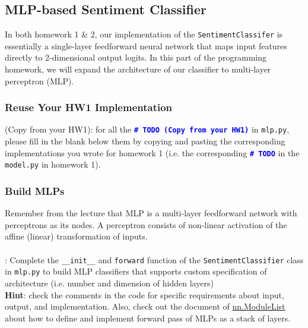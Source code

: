 \subsection{MLP-based Sentiment Classifier}
In both homework 1 \& 2, our implementation of the \texttt{SentimentClassifer} is essentially a single-layer feedforward neural network that maps input features directly to 2-dimensional output logits. In this part of the programming homework, we will expand the architecture of our classifier to multi-layer perceptron (MLP). 
\subsubsection{Reuse Your HW1 Implementation}
\todo{} (Copy from your HW1): for all the \textcolor{blue}{\texttt{\textbf{\#~TODO (Copy from your HW1)}}} in \texttt{mlp.py}, please fill in the blank below them by copying and pasting the corresponding implementations you wrote for homework 1 (i.e. the corresponding \textcolor{blue}{\texttt{\textbf{\#~TODO}}} in the \texttt{model.py} in homework 1).
\subsubsection{Build MLPs}
\label{subsubsec: build mlps}
Remember from the lecture that MLP is a multi-layer feedforward network with perceptrons as its nodes. A perceptron consists of non-linear activation of the affine (linear) transformation of inputs.
\\\\
\noindent \todo{}: Complete the \texttt{\_\_init\_\_} and \texttt{forward} function of the \texttt{SentimentClassifier} class in \texttt{mlp.py} to build MLP classifiers that supports custom specification of architecture (i.e. number and dimension of hidden layers)\\
\noindent \textbf{Hint}: check the comments in the code for specific requirements about input, output, and implementation. Also, check out the document of \href{https://pytorch.org/docs/stable/generated/torch.nn.ModuleList.html}{nn.ModuleList} about how to define and implement forward pass of MLPs as a stack of layers.
